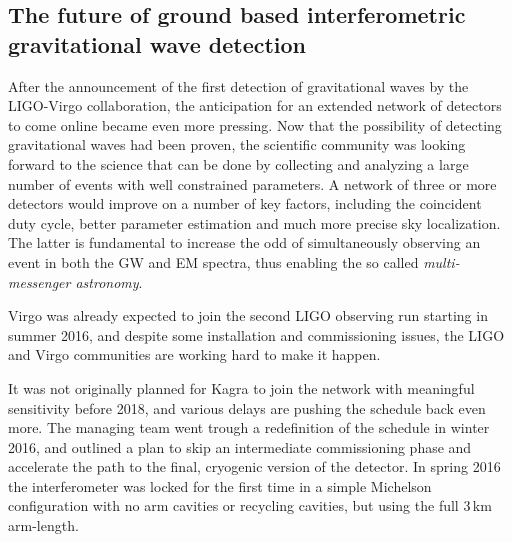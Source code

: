 \subsection{The future of ground based interferometric gravitational wave detection}\label{subsec:future}

After the announcement of the first detection of gravitational waves by the LIGO-Virgo collaboration, the anticipation for an extended network of detectors to come online became even more pressing.
Now that the possibility of detecting gravitational waves had been proven, the scientific community was looking forward to the science that can be done by collecting and analyzing a large number of events with well constrained parameters.
A network of three or more detectors would improve on a number of key factors, including the coincident duty cycle, better parameter estimation and much more precise sky localization. The latter is fundamental to increase the odd of simultaneously observing an event in both the GW and EM spectra, thus enabling the so called \textit{multi-messenger astronomy}.

Virgo was already expected to join the second LIGO observing run starting in summer 2016, and despite some installation and commissioning issues, the LIGO and Virgo communities are working hard to make it happen.

It was not originally planned for Kagra to join the network with meaningful sensitivity before 2018, and various delays are pushing the schedule back even more. 
The managing team went trough a redefinition of the schedule in winter 2016, and outlined a plan to skip an intermediate commissioning phase and accelerate the path to the final, cryogenic version of the detector. 
In spring 2016 the interferometer was locked for the first time in a simple Michelson configuration with no arm cavities or recycling cavities, but using the full 3\,km arm-length.

